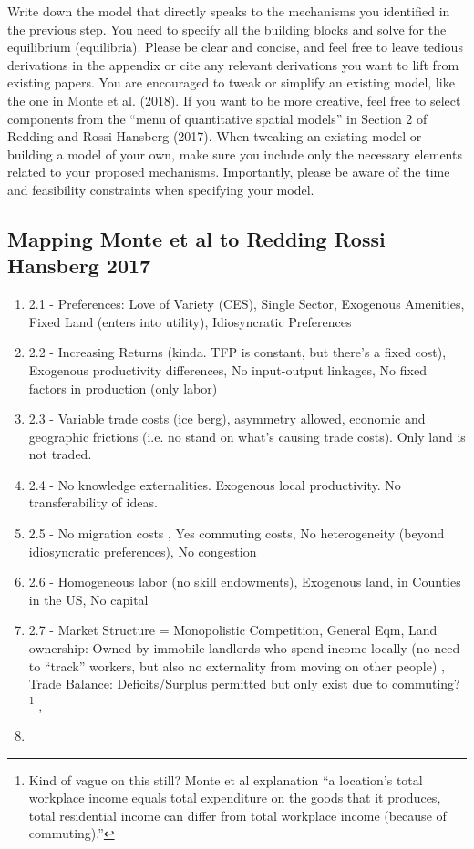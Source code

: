 \documentclass{article}
\begin{document}
Write down the model that directly speaks to the mechanisms you identified
in the previous step. You need to specify all the building blocks and solve for the
equilibrium (equilibria). Please be clear and concise, and feel free to leave tedious
derivations in the appendix or cite any relevant derivations you want to lift from
existing papers.
You are encouraged to tweak or simplify an existing model, like the one in Monte et
al. (2018). If you want to be more creative, feel free to select components from the
“menu of quantitative spatial models” in Section 2 of Redding and Rossi-Hansberg
(2017). When tweaking an existing model or building a model of your own, make
sure you include only the necessary elements related to your proposed mechanisms.
Importantly, please be aware of the time and feasibility constraints when specifying
your model.
\subsection{Mapping Monte et al to Redding Rossi Hansberg 2017}
\begin{enumerate}
\item 2.1 - Preferences: Love of Variety (CES), Single Sector, Exogenous Amenities, Fixed Land (enters into utility), Idiosyncratic Preferences
\item 2.2 - Increasing Returns (kinda. TFP is constant, but there's a fixed cost), Exogenous productivity differences, No input-output linkages, No fixed factors in production (only labor)
\item 2.3 - Variable trade costs (ice berg), asymmetry allowed, economic and geographic frictions (i.e. no stand on what's causing trade costs). Only land is not traded.
\item 2.4 - No knowledge externalities. Exogenous local productivity. No transferability of ideas. 
\item 2.5 - No migration costs , Yes commuting costs, No heterogeneity (beyond idiosyncratic preferences), No congestion
\item 2.6 - Homogeneous labor (no skill endowments), Exogenous land, in Counties in the US, No capital
\item 2.7 - Market Structure = Monopolistic Competition, General Eqm, Land ownership: Owned by immobile landlords who spend income locally (no need to ``track'' workers, but also no externality from moving on other people) , Trade Balance: Deficits/Surplus permitted but only exist due to commuting? \footnote{Kind of vague on this still? Monte et al explanation ``a location’s total workplace income equals total expenditure on the goods that it produces, total residential income can differ from total workplace income (because of commuting).''} , 
\item 
\end{enumerate}
\end{document}
